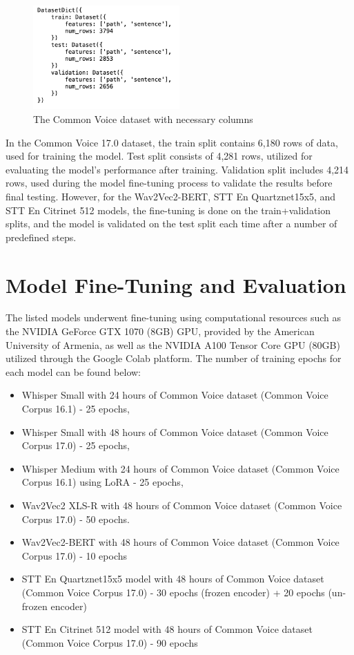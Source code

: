 \documentclass[conference]{IEEEtran}
\begin{document}
\begin{figure}[ht]
\centering
\includegraphics[width=0.5\textwidth]{4.png}
\caption{The Common Voice dataset with necessary columns}
\label{fig:whisper_asr_architecture}
\end{figure}

In the Common Voice 17.0 dataset, the train split contains 6,180 rows of data, used for training the model. Test split consists of 4,281 rows, utilized for evaluating the model’s performance after training. Validation split includes 4,214 rows, used during the model fine-tuning process to validate the results before final testing. However, for the Wav2Vec2-BERT, STT En Quartznet15x5, and STT En Citrinet 512 models, the fine-tuning is done on the train+validation splits, and the model is validated on the test split each time after a number of predefined steps.


\section{Model Fine-Tuning and Evaluation}

The listed models underwent fine-tuning using computational resources such as the NVIDIA GeForce GTX 1070 (8GB) GPU, provided by the American University of Armenia, as well as the NVIDIA A100 Tensor Core GPU (80GB) utilized through the Google Colab platform. The number of training epochs for each model can be found below:

\begin{itemize}
    \item Whisper Small with 24 hours of Common Voice dataset (Common Voice Corpus 16.1) - 25 epochs,
    \item Whisper Small with 48 hours of Common Voice dataset (Common Voice Corpus 17.0) - 25 epochs,
    \item Whisper Medium with 24 hours of Common Voice dataset (Common Voice Corpus 16.1) using LoRA - 25 epochs,
    \item Wav2Vec2 XLS-R with 48 hours of Common Voice dataset (Common Voice Corpus 17.0) - 50 epochs.
    \item Wav2Vec2-BERT with 48 hours of Common Voice dataset (Common Voice Corpus 17.0) - 10 epochs
    \item STT En Quartznet15x5 model with 48 hours of Common Voice dataset (Common Voice Corpus 17.0) -  30 epochs (frozen encoder) + 20 epochs (un-frozen encoder)
    \item STT En Citrinet 512 model with 48 hours of Common Voice dataset (Common Voice Corpus 17.0) - 90 epochs
    
    \end{itemize}
\end{document}
